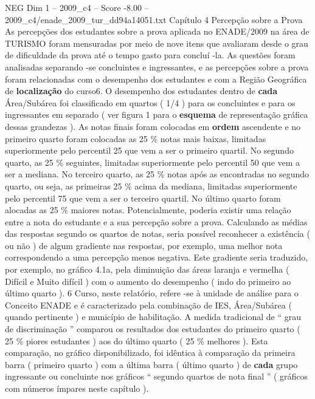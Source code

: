 \begin{textsample}{NEG Dim 1 – 2009\_c4 – Score -8.00 – 2009\_c4/enade\_2009\_tur\_dd94a14051.txt}  \label{ex:f1_neg_029}
Capítulo 4 Percepção sobre a Prova As percepções dos estudantes sobre a prova aplicada no ENADE/2009 na área de TURISMO foram mensuradas por meio de nove itens que avaliaram desde o grau de dificuldade da prova até o tempo gasto para concluí -la.
As questões foram analisadas separando -se concluintes e ingressantes, e as percepções sobre a prova foram relacionadas com o desempenho dos estudantes e com a Região Geográfica de \textbf{localização} do curso6.
O desempenho dos estudantes dentro de \textbf{cada} Área/Subárea foi classificado em quartos ( 1/4 ) para os concluintes e para os ingressantes em separado ( ver figura 1 para o \textbf{esquema} de representação gráfica dessas grandezas ).
As notas finais foram colocadas em \textbf{ordem} ascendente e no primeiro quarto foram colocadas as 25 \% notas mais baixas, limitadas superiormente pelo percentil 25 que vem a ser o primeiro quartil.
No segundo quarto, as 25 \% seguintes, limitadas superiormente pelo percentil 50 que vem a ser a mediana.
No terceiro quarto, as 25 \% notas após as encontradas no segundo quarto, ou seja, as primeiras 25 \% acima da mediana, limitadas superiormente pelo percentil 75 que vem a ser o terceiro quartil.
No último quarto foram alocadas as 25 \% maiores notas.
Potencialmente, poderia existir uma relação entre a nota do estudante e a sua percepção sobre a prova.
Calculando as médias das respostas segundo os quartos de notas, seria possível reconhecer a existência ( ou não ) de algum gradiente nas respostas, por exemplo, uma melhor nota correspondendo a uma percepção menos negativa.
Este gradiente seria traduzido, por exemplo, no gráfico 4.1a, pela diminuição das áreas laranja e vermelha ( Difícil e Muito difícil ) com o aumento do desempenho ( indo do primeiro ao último quarto ). 6 Curso, neste relatório, refere -se à unidade de análise para o Conceito ENADE e é caracterizado pela combinação de IES, Área/Subárea ( quando pertinente ) e município de habilitação.
A medida tradicional de “ grau de discriminação ” comparou os resultados dos estudantes do primeiro quarto ( 25 \% piores estudantes ) aos do último quarto ( 25 \% melhores ).
Esta comparação, no gráfico disponibilizado, foi idêntica à comparação da primeira barra ( primeiro quarto ) com a última barra ( último quarto ) de \textbf{cada} grupo ingressante ou concluinte nos gráficos “ segundo quartos de nota final ” ( gráficos com números ímpares neste capítulo ).

\end{textsample}
